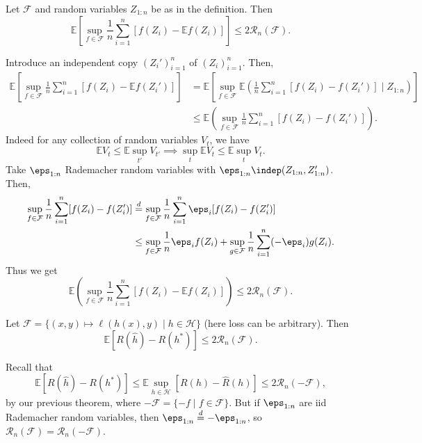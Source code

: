 \documentclass[12pt]{article}
\begin{document}
\begin{theorem}
	Let $\mathcal{F}$ and random variables $Z_{1:n}$ be as in the definition. Then
	\[
		\mathbb{E}\left[ \sup_{f \in \mathcal{F}} \frac{1}{n} \sum_{i = 1}^n [f(Z_i) - \mathbb{E} f(Z_i)] \right] \leq 2 \mathcal{R}_n(\mathcal{F}).
	\]
\end{theorem}

\begin{proofbox}
	Introduce an independent copy $(Z_i')_{i = 1}^n$ of $(Z_i)_{i = 1}^n$. Then,
	\begin{align*}
		\mathbb{E}\left[ \sup_{f \in \mathcal{F}}\frac{1}{n} \sum_{i = 1}^n [f(Z_i) - \mathbb{E} f(Z_i')] \right] &= \mathbb{E}\left[ \sup_{f \in \mathcal{F}} \mathbb{E} \left( \frac{1}{n} \sum_{i = 1}^n [f(Z_i) - f(Z_i')] \mid Z_{1:n}\right) \right] \\
															  &\leq \mathbb{E} \left( \sup_{f \in \mathcal{F}} \frac{1}{n} \sum_{i = 1}^n [f(Z_i) - f(Z_i')] \right).
	\end{align*}
	Indeed for any collection of random variables $V_t$, we have
	\[
	\mathbb{E} V_t \leq \mathbb{E} \sup_{t'} V_{t'} \implies \sup_t \mathbb{E}V_t \leq \mathbb{E} \sup_t V_t.
	\]
	Take $\eps_{1:n}$ Rademacher random variables with $\eps_{1:n} \indep (Z_{1:n}, Z_{1:n}')$. Then,
	\begin{align*}
		\sup_{f \in \mathcal{F}} \frac{1}{n} \sum_{i = 1}^n [f(Z_i) - f(Z_i')] &\overset d = \sup_{f \in \mathcal{F}} \frac{1}{n} \sum_{i = 1}^n \eps_i[f(Z_i) - f(Z_i')] \\
										       &\leq \sup_{f \in \mathcal{F}} \frac{1}{n} \eps_i f(Z_i) + \sup_{g \in \mathcal{F}} \frac{1}{n} \sum_{i = 1}^n (-\eps_i) g(Z_i).
	\end{align*}
	Thus we get
	\[
		\mathbb{E}\left(\sup_{f \in \mathcal{F}} \frac{1}{n} \sum_{i = 1}^n [f(Z_i) - \mathbb{E} f(Z_i)] \right) \leq 2 \mathcal{R}_n (\mathcal{F}).
	\]
\end{proofbox}

\begin{theorem}
	Let $\mathcal{F} = \{(x, y) \mapsto \ell(h(x), y) \mid h \in \mathcal{H}\}$ (here loss can be arbitrary). Then
	\[
	\mathbb{E}[R(\hat h) - R(h^\ast)] \leq 2\mathcal{R}_n (\mathcal{F}).
	\]
\end{theorem}

\begin{proofbox}
	Recall that
	\[
		\mathbb{E}[R(\hat h) - R(h^\ast)] \leq \mathbb{E} \sup_{h \in \mathcal{H}}[R(h) - \hat R(h)] \leq 2 \mathcal{R}_n (-\mathcal{F}),
	\]
	by our previous theorem, where $-\mathcal{F} = \{ -f \mid f \in \mathcal{F}\}$. But if $\eps_{1:n}$ are iid Rademacher random variables, then $\eps_{1:n} \overset d = - \eps_{1:n}$, so $\mathcal{R}_n(\mathcal{F}) = \mathcal{R}_n(-\mathcal{F})$.
\end{proofbox}
\end{document}
